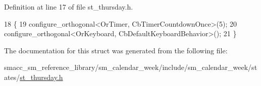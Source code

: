 Definition at line 17 of file st\+\_\+thursday.\+h.


\begin{DoxyCode}
18     \{
19         configure\_orthogonal<OrTimer,  CbTimerCountdownOnce>(5);    
20         configure\_orthogonal<OrKeyboard, CbDefaultKeyboardBehavior>();
21     \}
\end{DoxyCode}


The documentation for this struct was generated from the following file\+:\begin{DoxyCompactItemize}
\item 
smacc\+\_\+sm\+\_\+reference\+\_\+library/sm\+\_\+calendar\+\_\+week/include/sm\+\_\+calendar\+\_\+week/states/\hyperlink{st__thursday_8h}{st\+\_\+thursday.\+h}\end{DoxyCompactItemize}
